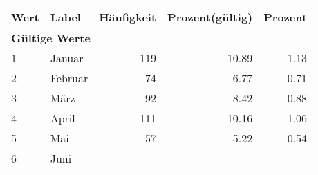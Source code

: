      \begin{longtable}{lXrrr}
     \toprule
     \textbf{Wert} & \textbf{Label} & \textbf{Häufigkeit} & \textbf{Prozent(gültig)} & \textbf{Prozent} \\
     \endhead
     \midrule
     \multicolumn{5}{l}{\textbf{Gültige Werte}}\\

     1 &
     \multicolumn{1}{X}{ Januar   } &


       \num{119} &
       \num[round-mode=places,round-precision=2]{10.89} &
         \num[round-mode=places,round-precision=2]{1.13} \\

     2 &
     \multicolumn{1}{X}{ Februar   } &


       \num{74} &
       \num[round-mode=places,round-precision=2]{6.77} &
         \num[round-mode=places,round-precision=2]{0.71} \\

     3 &
     \multicolumn{1}{X}{ März   } &


       \num{92} &
       \num[round-mode=places,round-precision=2]{8.42} &
         \num[round-mode=places,round-precision=2]{0.88} \\

     4 &
     \multicolumn{1}{X}{ April   } &


       \num{111} &
       \num[round-mode=places,round-precision=2]{10.16} &
         \num[round-mode=places,round-precision=2]{1.06} \\

     5 &
     \multicolumn{1}{X}{ Mai   } &


       \num{57} &
       \num[round-mode=places,round-precision=2]{5.22} &
         \num[round-mode=places,round-precision=2]{0.54} \\

     6 &
     \multicolumn{1}{X}{ Juni   } &



\end{longtable}
